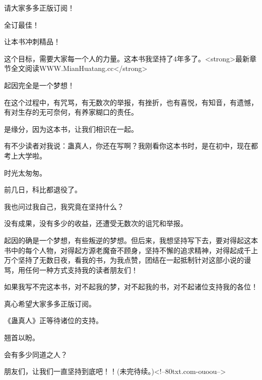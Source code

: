 \begin{this_body}
请大家多多正版订阅！

全订最佳！

让本书冲刺精品！

这个目标，需要大家每一个人的力量。这本书我坚持了4年多了。<strong>最新章节全文阅读WWW.MianHuatang.cc</strong>

起因完全是一个梦想！

在这个过程中，有咒骂，有无数次的举报，有挫折，也有喜悦，有知音，有遗憾，有对生存的无可奈何，有养家糊口的责任。

是缘分，因为这本书，让我们相识在一起。

有不少读者对我说：蛊真人，你还在写啊？我刚看你这本书时，是在初中，现在都考上大学啦。

时光太匆匆。

前几日，科比都退役了。

我也问过我自己，我究竟在坚持什么？

没有成果，没有多少的收益，还遭受无数次的诅咒和举报。

起因的确是一个梦想，有些叛逆的梦想。但后来，我想坚持写下去，要对得起这本书中的每个人物，对得起方源老魔奋不顾身，坚持不懈的追求精神，对得起成千上万个坚持了无数日夜，看我的书，为我点赞，团结在一起抵制针对这部小说的谩骂，用任何一种方式支持我的读者朋友们！

如果我写不完这本书，对不起我的梦，对不起我的书，对不起诸位支持我的各位！

真心希望大家多多正版订阅。

《蛊真人》正等待诸位的支持。

翘首以盼。

会有多少同道之人？

朋友们，让我们一直坚持到底吧！！(未完待续。)<!--80txt.com-ouoou-->

\end{this_body}

